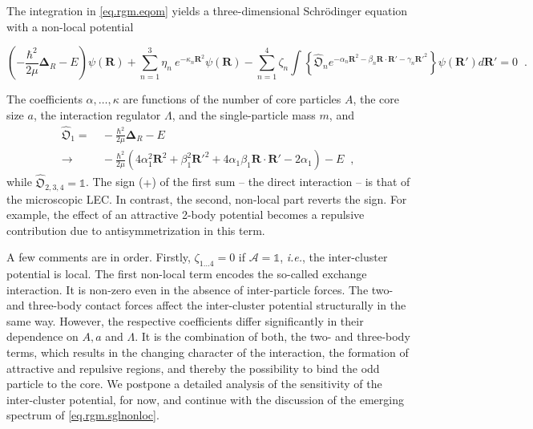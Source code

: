 \documentclass[onecolumn,preprint,superscriptaddress,nofootinbib,notitlepage,10pt,linenumbers]{revtex4-1}
\newcommand{\la}{\label}
\newcommand{\be}{\begin{equation}}
\newcommand{\ee}{\end{equation}}
\newcommand{\ie}{\textit{i.e.}\;}
\newcommand{\ve}[1]{\ensuremath{\boldsymbol{#1}}}
\begin{document}
The integration in \eqref{eq.rgm.eqom} yields a three-dimensional 
Schr\"odinger equation with a non-local potential
\begin{widetext}
\be\label{eq.rgm.sglnonloc}
\left(-\frac{\hbar^2}{2\mu}\ve{\Delta}_R-E\right)\psi(\ve{R})+\sum_{n=1}^3\eta_n~e^{-\kappa_n\ve{R}^2}\psi(\ve{R})-
\sum_{n=1}^4\zeta_n\int\left\lbrace\widehat{\mathfrak{O}}_ne^{-\alpha_n\ve{R}^2-\beta_n\ve{R}\cdot\ve{R}'-\gamma_n\ve{R}'^2}\right\rbrace\psi(\ve{R}') d\ve{R}'=0\;\;.
\ee
\end{widetext}
The coefficients $\alpha,\ldots,\kappa$ are functions of the number of
core particles $A$,
the core size $a$, the interaction regulator $\Lambda$,
and the single-particle mass $m$, and 
\begin{align}\la{eq.exop}
\widehat{\mathfrak{O}}_1=&~-\frac{\hbar^2}{2\mu}\ve{\Delta}_R-E\\
\to&~-\frac{\hbar^2}{2\mu}\left(4\alpha_1^2\ve{R}^2+\beta_1^2\ve{R}'^2
+4\alpha_1\beta_1\ve{R}\cdot\ve{R}'-2\alpha_1\right)-E\;\;,\nonumber
\end{align}
while $\widehat{\mathfrak{O}}_{2,3,4}=\mathbb{1}$. The sign ($+$) of the first sum -- the direct
interaction -- is that of the microscopic LEC. In contrast, the second, non-local
part reverts the sign. For example, the effect of an attractive 2-body potential
becomes a repulsive contribution due to antisymmetrization in this term.

A few comments are in order. Firstly, $\zeta_{1\ldots4}=0$ if $\mathcal{A}=\mathbb{1}$, \ie, the
inter-cluster potential is local. The first non-local term encodes the so-called exchange interaction.
It is non-zero even in the absence of inter-particle forces. The two- and three-body
contact forces affect the inter-cluster potential structurally in the same way. However, the respective
coefficients differ significantly in their dependence on $A,a$ and $\Lambda$. It is the combination
of both, the two- and three-body terms, which results in the changing character of the interaction,
the formation of attractive and repulsive regions, and thereby the possibility to bind the odd particle
to the core. We postpone a detailed analysis of the sensitivity of the inter-cluster potential,
for now, and continue with the discussion of the emerging spectrum of \eqref{eq.rgm.sglnonloc}.
\end{document}
